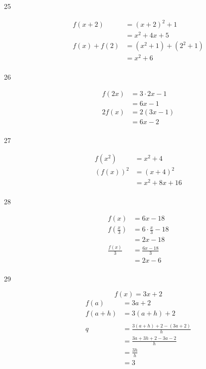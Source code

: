 \documentclass{exam}
\begin{document}
\begin{description}
      \item[25]
      \begin{align*}
        f(x + 2)     &= (x + 2)^2 + 1 \\
                     &= x^2 + 4x + 5 \\
        f(x) + f(2)  &= (x^2 + 1) + (2^2 + 1) \\
                     &= x^2 + 6 \\
      \end{align*}

    \item[26]
      \begin{align*}
        f(2x)  &= 3 \cdot 2x - 1 \\
               &= 6x - 1 \\
        2 f(x) &= 2 (3x - 1) \\
               &= 6x - 2 \\
      \end{align*}

      \item[27]
      \begin{align*}
        f(x^2)   &= x^2 + 4 \\
        (f(x))^2 &= (x + 4)^2 \\
                 &= x^2 + 8x + 16 \\
      \end{align*}

    \item[28]
      \begin{align*}
        f(x)                         &= 6x - 18 \\
        f \left( \frac{x}{3} \right) &= 6 \cdot \frac{x}{3} - 18 \\
                                     &= 2x - 18 \\
        \frac{f(x)}{3}               &= \frac{6x - 18}{3} \\
                                     &= 2x - 6 \\
      \end{align*}

    \item[29]
      \[
        f(x) = 3x + 2
      \]
      \begin{align*}
        f(a)     &= 3a + 2 \\
        f(a + h) &= 3(a + h) + 2 \\
        \\
        q        &= \frac{3(a + h) + 2 - (3a + 2)}{h} \\
                 &= \frac{3a + 3h + 2 - 3a - 2}{h} \\
                 &= \frac{3h}{h} \\
                 &= 3 \\
      \end{align*}


\end{description}
\end{document}
